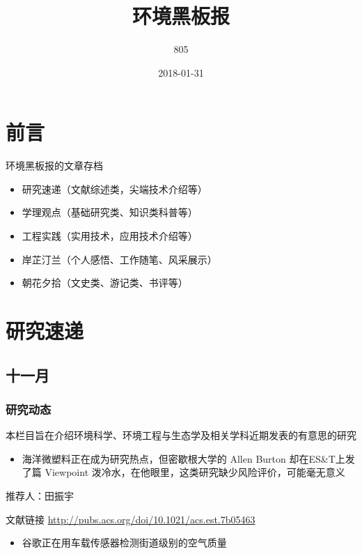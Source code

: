 \documentclass[]{book}
\title{环境黑板报}
\author{805}
\date{2018-01-31}
\providecommand{\tightlist}{%
  \setlength{\itemsep}{0pt}\setlength{\parskip}{0pt}}
\begin{document}
\maketitle

{
\setcounter{tocdepth}{1}
\tableofcontents
}
\chapter{前言}

环境黑板报的文章存档

\begin{itemize}
\item
  研究速递（文献综述类，尖端技术介绍等）
\item
  学理观点（基础研究类、知识类科普等）
\item
  工程实践（实用技术，应用技术介绍等）
\item
  岸芷汀兰（个人感悟、工作随笔、风采展示）
\item
  朝花夕拾（文史类、游记类、书评等）
\end{itemize}

\chapter{研究速递}

\section*{十一月}

\subsection*{研究动态}

本栏目旨在介绍环境科学、环境工程与生态学及相关学科近期发表的有意思的研究

\begin{itemize}
\tightlist
\item
  海洋微塑料正在成为研究热点，但密歇根大学的 Allen Burton
  却在ES\&T上发了篇 Viewpoint
  泼冷水，在他眼里，这类研究缺少风险评价，可能毫无意义
\end{itemize}

推荐人：田振宇

文献链接 \url{http://pubs.acs.org/doi/10.1021/acs.est.7b05463}

\begin{itemize}
\tightlist
\item
  谷歌正在用车载传感器检测街道级别的空气质量
\end{itemize}
\end{document}
